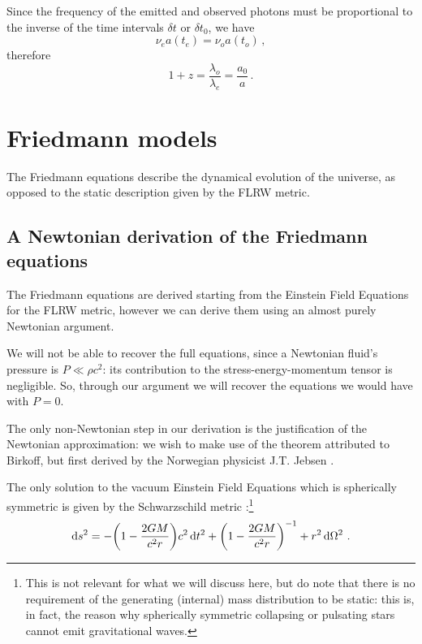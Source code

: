 \documentclass[main.tex]{subfiles}
\begin{document}
Since the frequency of the emitted and observed photons must be proportional to the inverse of the time intervals \(\delta t\) or \(\delta t_0 \), we have
\begin{equation}
  \nu_{e} a(t_{e}) = \nu_{o} a(t_{o})\,,
\end{equation}
%
therefore 
%
\begin{equation}
  1 + z = \frac{\lambda_{o}}{\lambda_{e}}
  = \frac{a_0 }{a}\,.
\end{equation}

\chapter{Friedmann models}

The Friedmann equations describe the dynamical evolution of the universe, as opposed to the static description given by the FLRW metric.

\section{A Newtonian derivation of the Friedmann equations}

The Friedmann equations are derived starting from the Einstein Field Equations for the FLRW metric, however we can derive them using an almost purely Newtonian argument.

We will not be able to recover the full equations, since a Newtonian fluid's pressure is \(P \ll \rho c^2\): its contribution to the stress-energy-momentum tensor is negligible.
So, through our argument we will recover the equations we would have with \(P=0\).

The only non-Newtonian step in our derivation is the justification of the Newtonian approximation: we wish to make use of the theorem attributed to Birkoff, but first derived by the Norwegian physicist J.T. Jebsen \cite[]{johansenDiscoveryBirkhoffTheorem2005}.

\begin{proposition}
The only solution to the vacuum Einstein Field Equations which is spherically symmetric is given by the Schwarzschild metric \cite[sec. 32.2]{misnerGravitation1973}:\footnote{This is not relevant for what we will discuss here, but do note that there is no requirement of the generating (internal) mass distribution to be static: this is, in fact, the reason why spherically symmetric collapsing or pulsating stars cannot emit  gravitational waves.}
%
\begin{align}
\dd{s^2} = - \qty(1 - \frac{2GM}{c^2r}) c^2 \dd{t^2} 
+ \qty(1 - \frac{2GM}{c^2r})^{-1} + r^2 \dd{\Omega^2}
\,.
\end{align}
\end{proposition}
\end{document}
